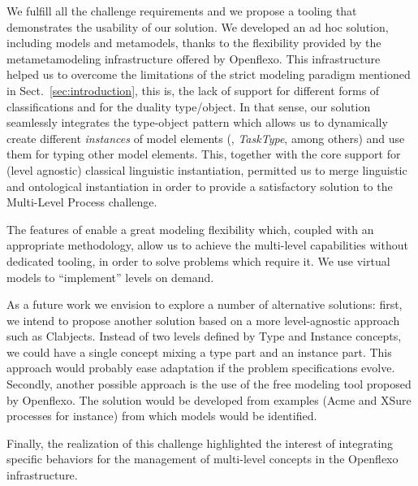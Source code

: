 

We fulfill all the challenge requirements and we propose a tooling that
demonstrates the usability of our solution. We developed an ad hoc solution,
including models and metamodels, thanks to the flexibility provided by the
metametamodeling infrastructure offered by Openflexo. This infrastructure
helped us to overcome the limitations of the strict modeling paradigm mentioned
in Sect.~\ref{sec:introduction}, this is, the lack of support for different
forms of classifications and for the duality type/object. In that sense, our
solution seamlessly integrates the type-object pattern which allows us to
dynamically create different \emph{instances} of model elements (\eg, \emph{TaskType}, among others) and use them for typing other model elements. This, together with the \FML core support for (level agnostic) classical linguistic instantiation, permitted us to merge linguistic and ontological instantiation in order to provide a satisfactory solution to the Multi-Level Process challenge.

The features of \FML enable a great modeling flexibility which, coupled with an appropriate methodology, allow us to achieve 
the multi-level capabilities without dedicated tooling, in order to solve
problems which require it. We use virtual models to \enquote{implement} levels on demand.


As a future work we envision to explore a number of alternative solutions:
first, we intend to propose another solution based on a more level-agnostic
approach such as Clabjects. Instead of two levels defined by Type and Instance
concepts, we could have a single concept mixing a type part and an instance
part. This approach would probably ease adaptation if the problem
specifications evolve. Secondly, another possible approach is the use of the
free modeling tool proposed by Openflexo. The solution would be developed from
examples (Acme and XSure processes for instance) from which models would be
identified.

Finally, the realization of this challenge highlighted the interest
of integrating specific behaviors for the management of multi-level concepts in
the Openflexo infrastructure. %
